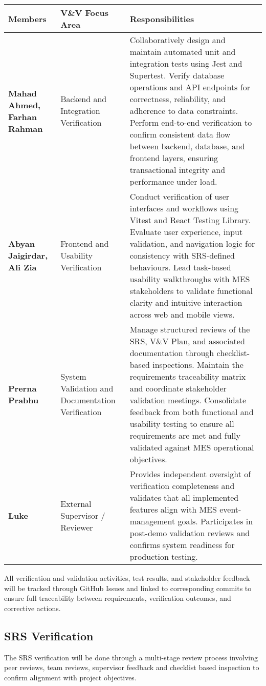 \documentclass[12pt, titlepage]{article}
\begin{document}
\begin{center}
\begin{tabular}{|p{4cm}|p{4cm}|p{7cm}|}
\hline
\textbf{Members} & \textbf{V\&V Focus Area} & \textbf{Responsibilities} \\ \hline
\textbf{Mahad Ahmed, Farhan Rahman} & Backend and Integration Verification & Collaboratively design and maintain automated unit and integration tests using Jest and Supertest. Verify database operations and API endpoints for correctness, reliability, and adherence to data constraints. Perform end-to-end verification to confirm consistent data flow between backend, database, and frontend layers, ensuring transactional integrity and performance under load. \\ \hline
\textbf{Abyan Jaigirdar, Ali Zia} & Frontend and Usability Verification & Conduct verification of user interfaces and workflows using Vitest and React Testing Library. Evaluate user experience, input validation, and navigation logic for consistency with SRS-defined behaviours. Lead task-based usability walkthroughs with MES stakeholders to validate functional clarity and intuitive interaction across web and mobile views. \\ \hline
\textbf{Prerna Prabhu} & System Validation and Documentation Verification & Manage structured reviews of the SRS, V\&V Plan, and associated documentation through checklist-based inspections. Maintain the requirements traceability matrix and coordinate stakeholder validation meetings. Consolidate feedback from both functional and usability testing to ensure all requirements are met and fully validated against MES operational objectives. \\ \hline
\textbf{Luke} & External Supervisor / Reviewer & Provides independent oversight of verification completeness and validates that all implemented features align with MES event-management goals. Participates in post-demo validation reviews and confirms system readiness for production testing. \\ \hline
\end{tabular}
\end{center}

All verification and validation activities, test results, and stakeholder feedback will be tracked through GitHub Issues and linked to corresponding commits to ensure full traceability between requirements, verification outcomes, and corrective actions.


\subsection{SRS Verification}
The SRS verification will be done through a multi-stage review process involving peer reviews, team reviews, supervisor feedback and checklist based inspection to confirm alignment with project objectives.
\end{document}
